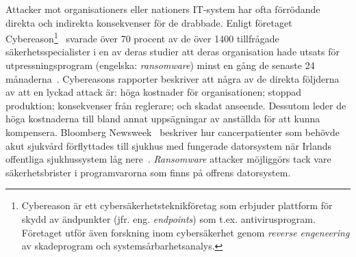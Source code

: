 Attacker mot organisationers eller nationers IT-system har ofta förrödande
direkta och indirekta konsekvenser för de drabbade. Enligt företaget
Cybereason\footnote{Cybereason är ett cybersäkerhetsteknikföretag som erbjuder
plattform för skydd av ändpunkter (jfr. eng. \emph{endpoints}) som t.ex.
antivirusprogram. Företaget utför även forskning inom cybersäkerhet genom
\emph{reverse engeneering} av skadeprogram och
systemsårbarhetsanalys.}~\cite{enwiki:1147596623} svarade över 70 procent av de
över 1400 tillfrågade säkerhetsspecialister i en
av deras studier att deras organisation hade utsats för
utpressningsprogram (engelska: \emph{ransomware}) minst en gång de senaste
24 månaderna~\cite{cyberreason2021, cyberreason2022}. Cybereasons rapporter
beskriver att några av de direkta följderna av att en lyckad attack är: höga
kostnader för organisationen; stoppad produktion; konsekvenser från reglerare;
och skadat anseende. Dessutom leder de höga kostnaderna till
bland annat uppsägningar av anställda för att kunna kompensera. Bloomberg
Newsweek~\cite{gallagher2023} beskriver hur cancerpatienter som behövde akut
sjukvård förflyttades till sjukhus med fungerade datorsystem när Irlands
offentliga sjukhussystem låg nere~\cite{hse_report}. \emph{Ransomware}
attacker möjliggörs tack vare säkerhetsbrister i programvarorna som finns på
offrens
datorsystem.
